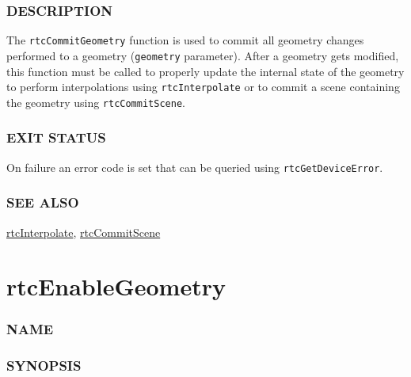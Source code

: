 \subsubsection{DESCRIPTION}\label{description}

The \texttt{rtcCommitGeometry} function is used to commit all geometry
changes performed to a geometry (\texttt{geometry} parameter). After a
geometry gets modified, this function must be called to properly update
the internal state of the geometry to perform interpolations using
\texttt{rtcInterpolate} or to commit a scene containing the geometry
using \texttt{rtcCommitScene}.

\subsubsection{EXIT STATUS}\label{exit-status}

On failure an error code is set that can be queried using
\texttt{rtcGetDeviceError}.

\subsubsection{SEE ALSO}\label{see-also}

\hyperref[rtcinterpolate]{rtcInterpolate},
\hyperref[rtccommitscene]{rtcCommitScene}

\pagebreak

\section{rtcEnableGeometry}\label{rtcenablegeometry}

\subsubsection{NAME}\label{name}

\begin{Shaded}
\begin{Highlighting}[]
\OperatorTok{{-}}
\end{Highlighting}
\end{Shaded}

\subsubsection{SYNOPSIS}\label{synopsis}

\begin{Shaded}
\begin{Highlighting}[]

\OperatorTok{(}\OperatorTok{);}
\end{Highlighting}
\end{Shaded}


